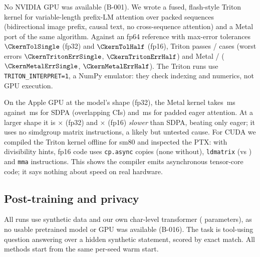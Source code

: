 No NVIDIA GPU was available (B-001). We wrote a fused, flash-style Triton~\citep{triton,flashattn} kernel
for variable-length prefix-LM attention over packed sequences (bidirectional image prefix, causal text, no
cross-sequence attention) and a Metal port of the same algorithm. Against an fp64 reference with max-error
tolerances $\CkernTolSingle$ (fp32) and $\CkernTolHalf$ (fp16), Triton passes
\CkernTritonPass/\CkernTritonCases{} cases (worst errors $\CkernTritonErrSingle$, $\CkernTritonErrHalf$)
and Metal \CkernMetalPass/\CkernMetalCases{} ($\CkernMetalErrSingle$, $\CkernMetalErrHalf$). The Triton runs
use \texttt{TRITON\_INTERPRET=1}, a NumPy emulator: they check indexing and numerics, not GPU execution.

On the Apple GPU at the model's shape (fp32), the Metal kernel takes \CkernMpsModelSingleMetal\,ms against
\CkernMpsModelSingleSdpa\,ms for SDPA (overlapping CIs) and \CkernMpsModelSingleEager\,ms for padded eager
attention. At a larger shape it is \CkernMpsLargeSingleMetalOverSdpa$\times$ (fp32) and
\CkernMpsLargeHalfMetalOverSdpa$\times$ (fp16) \emph{slower} than SDPA, beating only eager; it uses no
simdgroup matrix instructions, a likely but untested cause. For CUDA we compiled the Triton kernel offline for
sm80 and inspected the PTX: with divisibility hints, fp16 code uses \CkernIrHalfHintsCpAsync{}
\texttt{cp.async} copies (none without), \CkernIrHalfHintsLdmatrix{} \texttt{ldmatrix} (vs
\CkernIrHalfPlainLdmatrix) and \CkernIrHalfHintsMma{} \texttt{mma} instructions. This shows the compiler
emits asynchronous tensor-core code; it says nothing about speed on real hardware.

\subsection{Post-training and privacy}
\label{sec:ext-pt}

All runs use synthetic data and our own char-level transformer (\CptParams{} parameters), as no usable
pretrained model or GPU was available (B-016). The task is tool-using question answering over a hidden
synthetic statement, scored by exact match. All methods start from the same per-seed warm start.


